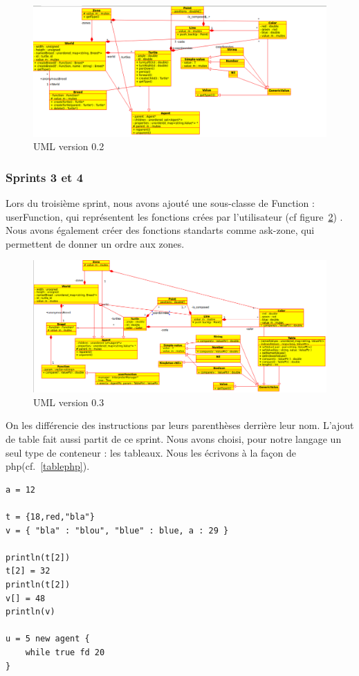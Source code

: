 \begin{figure}[h]
\includegraphics[scale=0.45]{doc/report/uml/v02.png}
\caption{\label{v0.2} UML version 0.2}
\end{figure}
\subsubsection{Sprints 3 et 4}
Lors du troisième sprint, nous avons ajouté une sous-classe de Function : userFunction, qui représentent les fonctions crées par l'utilisateur (cf figure~\ref{v0.3}) . Nous avons également créer des fonctions standarts comme ask-zone, qui permettent de donner un ordre aux zones.
\begin{figure}[h]
\includegraphics[scale=0.4]{doc/report/uml/v03.png}
\caption{\label{v0.3} UML version 0.3}
\end{figure}

On les différencie des instructions par leurs parenthèses derrière leur nom.
L'ajout de table fait aussi partit de ce sprint. Nous avons choisi, pour notre langage un seul type de conteneur : les tableaux.
Nous les écrivons à la façon de php(cf.~\ref{tablephp}).
\begin{lstlisting}[label=tablephp,caption=Syntaxe des tables en Stibbons]
a = 12

t = {18,red,"bla"}
v = { "bla" : "blou", "blue" : blue, a : 29 }

println(t[2])
t[2] = 32
println(t[2])
v[] = 48
println(v)

u = 5 new agent {
	while true fd 20
}
\end{lstlisting}

